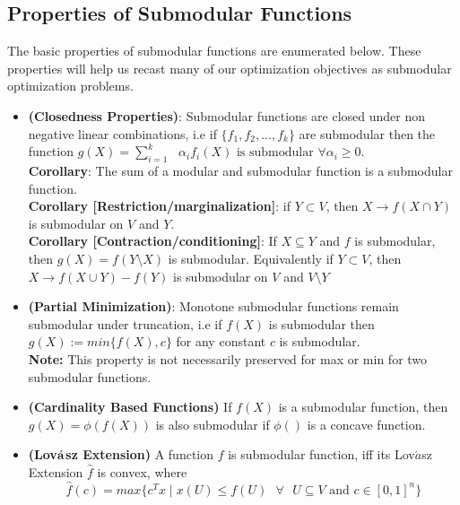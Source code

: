 \subsection{Properties of Submodular Functions}
The basic properties of submodular functions are enumerated below. These properties will help us recast many of our optimization objectives as submodular optimization problems.\\

\begin{itemize}
 \item {\bf \lemma (Closedness Properties)}: Submodular functions are closed under non negative linear combinations, i.e if $\{f_1,f_2,...,f_k\}$ are submodular then the function $g(X) = \sum\limits_{i=1}^k\text{ } \alpha_if_i(X) \text{ is submodular }\forall \alpha_i \geq 0$.\\
 
 {\bf Corollary}: The sum of a modular and submodular function is a submodular function.\\
 
 {\bf Corollary [Restriction/marginalization]}: if $Y\subset V$, then $X\rightarrow f(X \cap Y)$ is submodular on $V$ and $Y$.\\
 
 {\bf Corollary [Contraction/conditioning]}: If $X \subseteq Y$ and $f$ is submodular, then $g(X) = f(Y\setminus X)$ is submodular. Equivalently if $Y\subset V$, then $X\rightarrow f(X \cup Y) - f(Y)$ is submodular on $V$ and $V\setminus Y$\\
 
 \item {\bf \lemma (Partial Minimization)}: Monotone submodular functions remain submodular under truncation, i.e if $f(X)$ is submodular then $g(X) := min\{f(X),c\}$ for any constant $c$ is submodular.\\
 
 {\bf Note:} This property is not necessarily preserved for max or min for two submodular functions.\\
 
 \item{\bf \lemma (Cardinality Based Functions)} If $f(X)$ is a submodular function, then $g(X) = \phi(f(X))$ is also submodular if $\phi()$ is a concave function.\\
 
 \item{\bf \lemma (Lov$\acute{\bf a}$sz Extension)} A function $f$ is submodular function, iff its Lov$\acute{a}$sz Extension $\hat{f}$ is convex, where
 \[
  \hat{f}(c) = max\{c^Tx \mid x(U) \leq f(U) \text{ } \forall \text{ } U \subseteq V \text{ and } c\in[0,1]^n\}
 \]

\end{itemize}